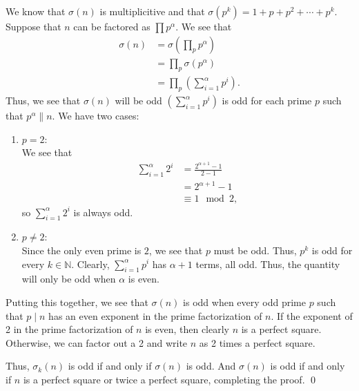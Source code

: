 \documentclass[12 pt]{amsart}
\begin{document}
  We know that $\sigma(n)$ is multiplicitive and that 
  $\sigma(p^k) = 1 + p + p^2 + \cdots + p^k$.
  Suppose that $n$ can be factored as $\prod p^{\alpha}$.
  We see that 
  \begin{align*}
    \sigma(n) &= \sigma\left( \prod_p p^{\alpha} \right) \\
              &= \prod_p \sigma(p^{\alpha}) \\
              &= \prod_p \left( \sum_{i = 1}^{\alpha} p^i \right).
  \end{align*}
  Thus, we see that $\sigma(n)$ will be odd 
  $\left( \sum_{i = 1}^{\alpha} p^i \right)$ is odd for each
  prime $p$ such that $p^{\alpha} \parallel n$.
  We have two cases:
  \begin{enumerate}
    \item $p = 2$: \\
      We see that 
      \begin{align*}
         \sum_{i = 1}^{\alpha} 2^i 
         &= \frac{2^{\alpha + 1} - 1}{2 - 1} \\
         &= 2^{\alpha + 1} - 1 \\
         &\equiv 1 \mod 2,
      \end{align*}
      so $\sum_{i = 1}^{\alpha} 2^i$ is always odd.
    \item $p \neq 2$: \\
      Since the only even prime is $2$, we see that
      $p$ must be odd.
      Thus, $p^k$ is odd for every $k \in \mathbb{N}$.
      Clearly, 
      $\sum_{i = 1}^{\alpha} p^i$ has $\alpha + 1$ terms,
      all odd.
      Thus, the quantity will only be odd when $\alpha$ is
      even.
  \end{enumerate}
  
  Putting this together, we see that $\sigma(n)$ is odd
  when every odd prime $p$ such that $p \mid n$ has an 
  even exponent in the prime factorization of $n$.
  If the exponent of 2 in the prime factorization of $n$ is
  even, then clearly $n$ is a perfect square.
  Otherwise, we can factor out a 2 and write $n$ as 2 times
  a perfect square. 

  Thus, $\sigma_k(n)$ is odd if and only if $\sigma(n)$ is odd.
  And $\sigma(n)$ is odd if and only if $n$ is a perfect square
  or twice a perfect square, completing the proof.
  \qed
\vfill
\newpage
\end{document}

